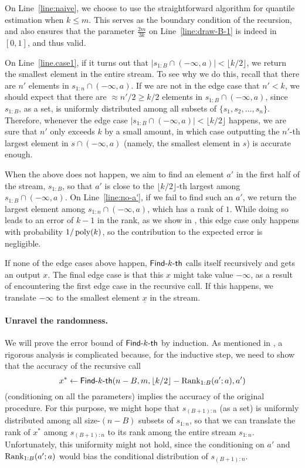 On Line~\ref{line:naive}, we choose to use the straightforward algorithm for quantile estimation when $k \le m$. This serves as the boundary condition of the recursion, and also ensures that the parameter $\frac{2m}{3k}$ on Line~\ref{line:draw-B-1} is indeed in $[0, 1]$, and thus valid.

On Line~\ref{line.case1}, if it turns out that $|s_{1:B} \cap (-\infty, a)| < \lfloor k/2\rfloor$, we return the smallest element in the entire stream. To see why we do this, recall that there are $n'$ elements in $s_{1:n} \cap (-\infty, a)$. If we are not in the edge case that $n' < k$, we should expect that there are $\approx n' / 2 \ge k / 2$ elements in $s_{1:B} \cap (-\infty, a)$, since $s_{1:B}$, as a set, is uniformly distributed among all subsets of $\{s_1, s_2, \ldots, s_n\}$. Therefore, whenever the edge case $|s_{1:B} \cap (-\infty, a)| < \lfloor k/2\rfloor$ happens, we are sure that $n'$ only exceeds $k$ by a small amount, in which case outputting the $n'$-th largest element in $s \cap (-\infty, a)$ (namely, the smallest element in $s$) is accurate enough.

When the above does not happen, we aim to find an element $a'$ in the first half of the stream, $s_{1:B}$, so that $a'$ is close to the $\lfloor k/2\rfloor$-th largest among $s_{1:B} \cap (-\infty, a)$. On Line~\ref{line:no-a'}, if we fail to find such an $a'$, we return the largest element among $s_{1:n} \cap (-\infty, a)$, which has a rank of $1$. While doing so leads to an error of $k - 1$ in the rank, as we show in , this edge case only happens with probability $1/\operatorname*{poly}(k)$, so the contribution to the expected error is negligible.

If none of the edge cases above happen, $\textsf{Find-}k\textsf{-th}$ calls itself recursively and gets an output $x$. The final edge case is that this $x$ might take value $-\infty$, as a result of encountering the first edge case in the recursive call. If this happens, we translate $-\infty$ to the smallest element $\underline{x}$ in the stream.

\paragraph{Unravel the randomness.} We will prove the error bound of $\textsf{Find-}k\textsf{-th}$ by induction. As mentioned in , a rigorous analysis is complicated because, for the inductive step, we need to show that the accuracy of the recursive call
\[
    x^* \gets \textsf{Find-}k\textsf{-th}(n - B, m, \lfloor k/2\rfloor - \mathrm{Rank}_{1:B}(a'; a), a')
\]
(conditioning on all the parameters) implies the accuracy of the original procedure. For this purpose, we might hope that $s_{(B+1):n}$ (as a set) is uniformly distributed among all size-$(n-B)$ subsets of $s_{1:n}$, so that we can translate the rank of $x^*$ among $s_{(B+1):n}$ to its rank among the entire stream $s_{1:n}$. Unfortunately, this uniformity might not hold, since the conditioning on $a'$ and $\mathrm{Rank}_{1:B}(a'; a)$ would bias the conditional distribution of $s_{(B+1):n}$.

